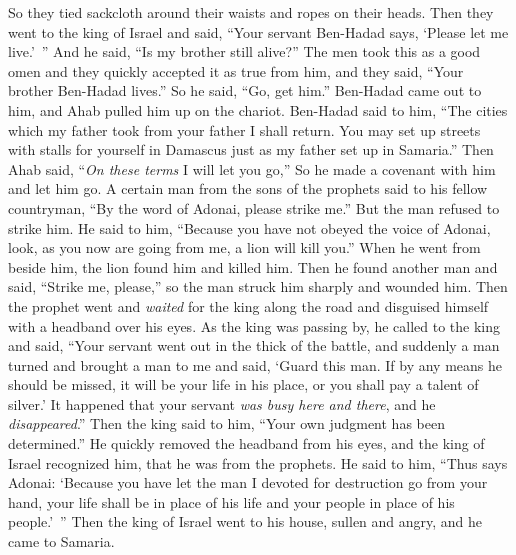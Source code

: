 \begin{biblechapter}
\verse So they tied sackcloth around their waists and ropes on their heads. Then they went to the king of Israel and said, “Your servant Ben-Hadad says, ‘Please let me live.’ ” And he said, “Is my brother still alive?”
\verse The men took this as a good omen and they quickly accepted it as true from him, and they said, “Your brother Ben-Hadad lives.” So he said, “Go, get him.” Ben-Hadad came out to him, and Ahab pulled him up on the chariot.
\verse Ben-Hadad said to him, “The cities which my father took from your father I shall return. You may set up streets with stalls for yourself in Damascus just as my father set up in Samaria.” Then Ahab said, “\textit{On these terms} I will let you go,” So he made a covenant with him and let him go.
\verse A certain man from the sons of the prophets said to his fellow countryman, “By the word of Adonai, please strike me.” But the man refused to strike him.
\verse He said to him, “Because you have not obeyed the voice of Adonai, look, as you now are going from me, a lion will kill you.” When he went from beside him, the lion found him and killed him.
\verse Then he found another man and said, “Strike me, please,” so the man struck him sharply and wounded him.
\verse Then the prophet went and \textit{waited} for the king along the road and disguised himself with a headband over his eyes.
\verse As the king was passing by, he called to the king and said, “Your servant went out in the thick of the battle, and suddenly a man turned and brought a man to me and said, ‘Guard this man. If by any means he should be missed, it will be your life in his place, or you shall pay a talent of silver.’
\verse It happened that your servant \textit{was busy here and there}, and he \textit{disappeared}.” Then the king said to him, “Your own judgment has been determined.”
\verse He quickly removed the headband from his eyes, and the king of Israel recognized him, that he was from the prophets.
\verse He said to him, “Thus says Adonai: ‘Because you have let the man I devoted for destruction go from your hand, your life shall be in place of his life and your people in place of his people.’ ”
\verse Then the king of Israel went to his house, sullen and angry, and he came to Samaria.
\end{biblechapter}

